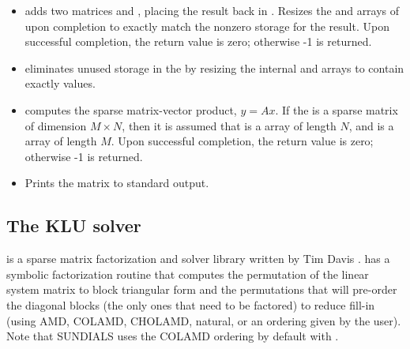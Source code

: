 \begin{itemize}
\item {}
  \par {} adds two  matrices  and
  , placing the result back in .  Resizes the 
  and  arrays of  upon completion to exactly match
  the nonzero storage for the result.  Upon successful completion, the
  return value is zero; otherwise -1 is returned.

\item {}
  \par {} eliminates unused storage in the
    by resizing the internal  and
   arrays to contain exactly  values.

\item {}
  \par {} computes the sparse matrix-vector
  product, $y=Ax$.  If the   
   is a sparse matrix of dimension $M\times N$, then it is assumed
   that  is a  array of  length $N$, and  is a
    array of length $M$. Upon successful completion, the
   return value is zero; otherwise -1 is returned.

\item {}
  \par {} Prints the  matrix  to
  standard output.

\end{itemize}



\subsection{The KLU solver}\label{ss:klu}

{\klu} is a sparse matrix factorization and solver library written by Tim
Davis \cite{KLU_site,DaPa:10}.  
{\klu} has a symbolic factorization routine that computes the permutation of 
the linear system matrix to block triangular form and the permutations that will 
pre-order the diagonal blocks (the only ones that need to be factored) to reduce 
fill-in (using AMD, COLAMD, CHOLAMD, natural, or an ordering given by the user).  
Note that SUNDIALS uses the COLAMD ordering by default with {\klu}.

